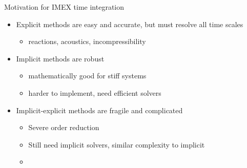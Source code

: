 \begin{frame}{Motivation for IMEX time integration}
  \begin{itemize}
  \item Explicit methods are easy and accurate, but must resolve all time scales
    \begin{itemize}
    \item reactions, acoustics, incompressibility
    \end{itemize}
  \item Implicit methods are robust
    \begin{itemize}
    \item mathematically good for stiff systems
    \item harder to implement, need efficient solvers
    \end{itemize}
  \item Implicit-explicit methods are fragile and complicated
    \begin{itemize}
    \item Severe order reduction
    \item Still need implicit solvers, similar complexity to implicit
    \item {}
    \end{itemize}
  \end{itemize}
\end{frame}
